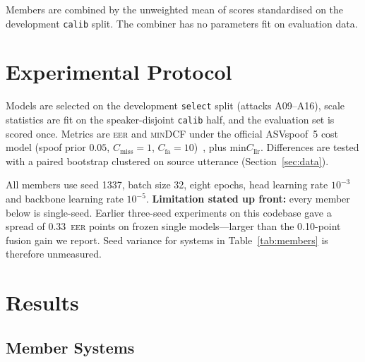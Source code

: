 \documentclass{llncs}
\newcommand{\eer}{\textsc{eer}}
\newcommand{\mindcf}{\textsc{minDCF}}
\begin{document}
Members are combined by the unweighted mean of scores standardised on the
development \texttt{calib} split.  The combiner has no parameters fit on
evaluation data.

\section{Experimental Protocol}
\label{sec:protocol}

Models are selected on the development \texttt{select} split (attacks A09--A16),
scale statistics are fit on the speaker-disjoint \texttt{calib} half, and the
evaluation set is scored once.  Metrics are \eer{} and \mindcf{} under the
official ASVspoof~5 cost model (spoof prior $0.05$, $C_\text{miss}{=}1$,
$C_\text{fa}{=}10$)~\cite{asvspoof5,tdcf}, plus $\text{min}C_\text{llr}$.
Differences are tested with a paired bootstrap clustered on source utterance
(Section~\ref{sec:data}).

All members use seed 1337, batch size 32, eight epochs, head learning rate
$10^{-3}$ and backbone learning rate $10^{-5}$.  \textbf{Limitation stated up
front:} every member below is single-seed.  Earlier three-seed experiments on
this codebase gave a spread of 0.33~\eer{} points on frozen single models---larger
than the 0.10-point fusion gain we report.  Seed variance for systems in
Table~\ref{tab:members} is therefore unmeasured.

\section{Results}
\label{sec:results}

\subsection{Member Systems}
\end{document}
